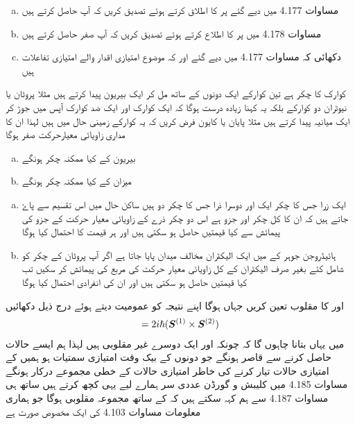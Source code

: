 \begin{enumerate}[a.]
\item
مساوات 4.177 میں دیے گئے  پر  کا اطلاق کرتے ہوئے تصدیق کریں کہ آپ  حاصل کرتے ہیں 
\item
مساوات 4.178 میں  پر  کا اطلاع کرتے ہوئے تصدیق کریں کہ آپ صفر حاصل کرتے ہیں 
\item
دکھائی کہ مساوات 4.177 میں دیے گئے  اور   کہ موضوع امتیازی اقدار والے امتیازی تفاعلات ہیں 
\end{enumerate}
کوارک کا چکر  ہے تین کوارکے ایک دونوں کے ساتھ مل کر ایک بیریون پیدا کرتے ہیں مثلا پروٹان یا نیوٹران دو کوارکے بلکہ یہ کہنا زیادہ درست ہوگا کہ ایک کوارک اور ایک ضد کوارک آپس میں جوڑ کر ایک میانیہ پیدا کرتے ہیں مثلا پایان یا کایون فرض کریں کہ یہ کوارکے زمینی حال میں ہیں لہذا ان کا مداری زاویائی معیارحرکت صفر ہوگا 
\begin{enumerate}[a.]
\item
بیریون  کے کیا ممکنہ چکر ہونگے 
\item
میزان کے کیا ممکنہ چکر ہونگے 
\end{enumerate}
\begin{enumerate}[a.]
\item
ایک زرا جس کا چکر ایک اور دوسرا ذرا جس کا چکر دو ہیں ساکن حال میں اس تقسیم سے پاۓ جاتے ہیں کہ ان کا کل چکر  اور  جزو  ہے اس دو چکر ذرے کے زاویائی معیار حرکت کے  جزو کی پیمائش سے کیا قیمتیں حاصل ہو سکتی ہیں اور ہر قیمت کا احتمال کیا ہوگا 
\item
ہائیڈروجن جوہر کے  میں ایک الیکٹران مخالف میدان پایا جاتا ہے اگر آپ پروٹان کے چکر کو شامل کئے بغیر صرف الیکٹران کے کل زاویائی معیار حرکت کی مربع کی پیمائش کر سکیں تب کیا قیمتیں حاصل ہو سکتی ہیں اور ان کی انفرادی احتمال کیا ہوگا 
\end{enumerate}
 اور  کا مقلوب تعین کریں جہاں  ہوگا اپنے نتیجہ کو عمومیت دیتے ہوئے درج ذیل دکھائیں 
\begin{align} 
[S^2 , \kvec{S}^{(1)}] = 2 i \hslash (\kvec{S}^{(1)} \times \kvec{S}^{(2)})
\end{align}
میں یہاں بتانا چاہوں گا کہ چونکہ  اور  ایک دوسرے غیر مقلوبی ہیں لہذا ہم ایسے حالات حاصل کرنے سے قاصر ہونگے جو دونوں کے بیک وقت امتیازی سمتيات ہو ہمیں  کے امتیازی حالات تیار کرنے کی خاطر  امتیازی حالات کے خطی مجموعے درکار ہونگے مساوات 4.185 ميں كليبش و گورڈن عددی سر ہمارے لیے یہی کچھ کرتے ہیں ساتھ ہی مساوات 4.187 سے ہم کہہ سکتے ہیں کہ  کے ساتھ مجموعہ  مقلوبی  ہوگا جو ہماری معلومات مساوات 4.103 کی ایک مخصوص صورت ہے 

